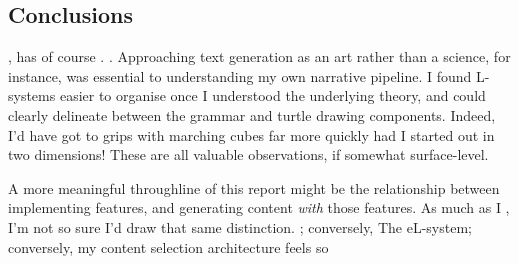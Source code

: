 \documentclass[a4paper, 11pt]{article}
\begin{document}
\begin{flushleft}
\section{Conclusions}

\vspace{5pt}\noindent
, has of course . . Approaching text generation as an art rather than a science, for instance, was essential to understanding my own narrative pipeline. I found L-systems easier to organise once I understood the underlying theory, and could clearly delineate between the grammar and turtle drawing components. Indeed, I'd have got to grips with marching cubes far more quickly had I started out in two dimensions! These are all valuable observations, if somewhat surface-level.

\vspace{5pt}\noindent
A more meaningful throughline of this report might be the relationship between implementing features, and generating content \textit{with} those features. As much as I , I'm not so sure I'd draw that same distinction. ; conversely, The eL-system; conversely, my content selection architecture feels so 

\vspace{5pt}

\newpage


\end{flushleft}
\end{document}
